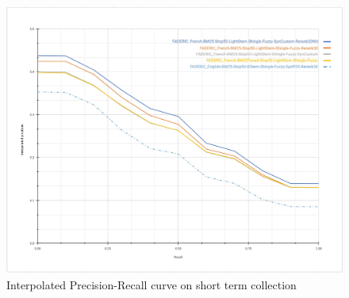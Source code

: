 \begin{figure}[tbp]
  \centering
  \includegraphics[width=1\linewidth]{figure/iprec-recall-SHORT-TERM.jpg}
  \caption{Interpolated Precision-Recall curve on short term collection}
  \label{fig:precision-recall-curve-short-term}
\end{figure}

